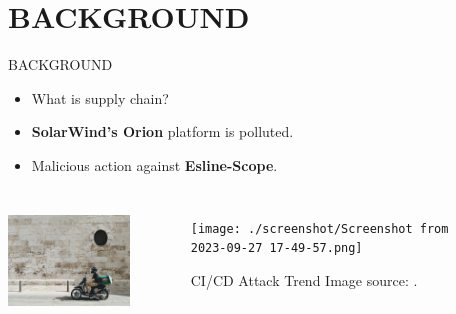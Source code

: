 \section{BACKGROUND}
\begin{frame}{BACKGROUND}
  \begin{itemize}
    \item What is supply chain? 
    \item \textbf{SolarWind's Orion} platform is polluted.
    \item Malicious action against \textbf{Esline-Scope}.
  \end{itemize}
  \begin{columns}
    \includegraphics[height=3cm, width=5cm]{./screenshot/lucian-alexe-afDu-GuxjjM-unsplash.jpg}
    \begin{figure}[htbp]
      \texttt{[image: ./screenshot/Screenshot from 2023-09-27 17-49-57.png]}
      \caption{CI/CD Attack Trend Image source: \cite{mcbride2023predictions}.}
    \end{figure}
  \end{columns}
\end{frame}